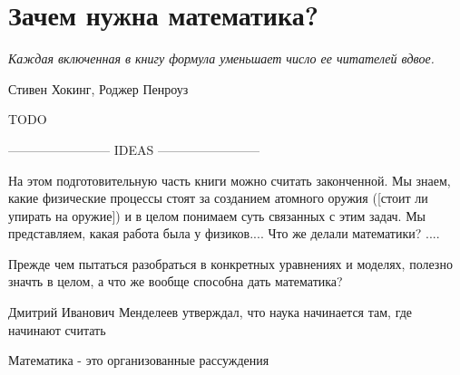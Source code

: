\chapter{Зачем нужна математика?}\label{ch:why_math}

\epigraph{\emph{Каждая включенная в книгу формула \break уменьшает число ее читателей вдвое.}}{Стивен Хокинг, Роджер Пенроуз}

TODO

------------------------ IDEAS ------------------------ 

На этом подготовительную часть книги можно считать законченной.
Мы знаем, какие физические процессы стоят за созданием атомного оружия ([стоит ли упирать на оружие]) и в целом понимаем суть связанных с этим задач.
Мы представляем, какая работа была у физиков....
Что же делали математики? ....


Прежде чем пытаться разобраться в конкретных уравнениях и моделях, полезно значть в целом, а что же вообще способна дать математика?


Дмитрий Иванович Менделеев утверждал, что наука начинается там, где начинают считать

Математика - это организованные рассуждения
